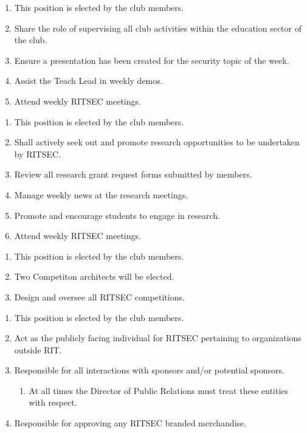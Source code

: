 
\begin{enumerate}
  \item This position is elected by the club members.
  \item Share the role of supervising all club activities within the education
    sector of the club.
  \item Ensure a presentation has been created for the security topic of the
    week.
  \item Assist the Teach Lead in weekly demos.
  \item Attend weekly RITSEC meetings.
\end{enumerate}


\begin{enumerate}
  \item This position is elected by the club members.
  \item Shall actively seek out and promote research opportunities to be
    undertaken by RITSEC.
  \item Review all research grant request forms submitted by members. 
  \item Manage weekly news at the research meetings.
  \item Promote and encourage students to engage in research.
  \item Attend weekly RITSEC meetings.
\end{enumerate}


\begin{enumerate}
  \item This position is elected by the club members.
  \item Two Competiton architects will be elected.
  \item Design and oversee all RITSEC competitions.
\end{enumerate}


\begin{enumerate}
  \item This position is elected by the club members.
  \item Act as the publicly facing individual for RITSEC pertaining to
    organizations outside RIT.
  \item Responsible for all interactions with sponsors and/or potential sponsors.
  \begin{enumerate}
    \item At all times the Director of Public Relations must treat these
      entities with respect.
  \end{enumerate}
  \item Responsible for approving any RITSEC branded merchandise.
\end{enumerate}

